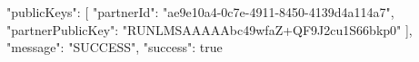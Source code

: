 \begin{spverbatim}
{
    "publicKeys": [
        {
            "partnerId": "ae9e10a4-0c7e-4911-8450-4139d4a114a7",
            "partnerPublicKey": "RUNLMSAAAAAbc49wfaZ+QF9J2cu1S66bkp0"
        }
    ],
    "message": "SUCCESS",
    "success": true
}
\end{spverbatim}